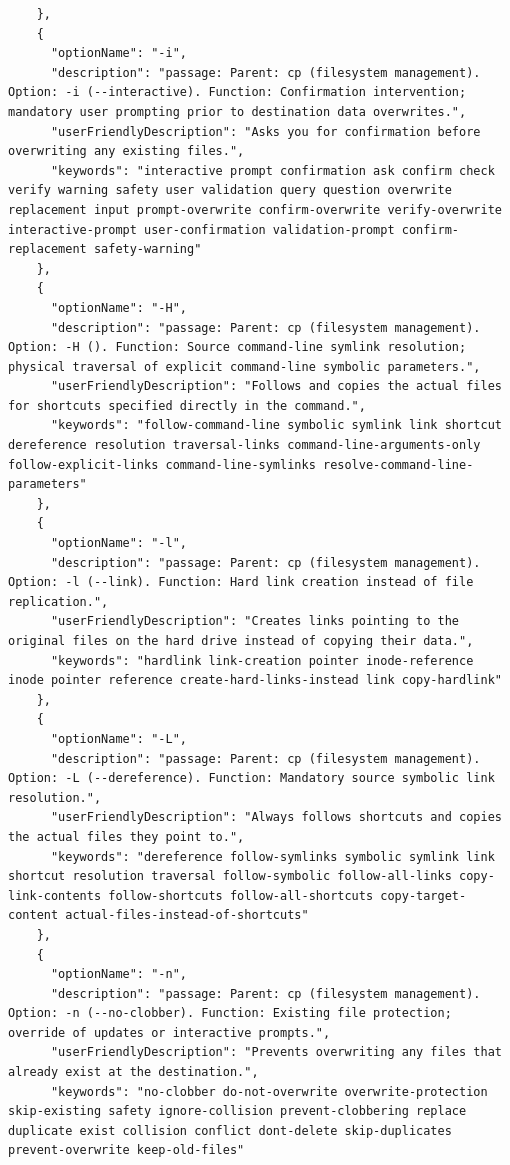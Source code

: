 \begin{appendix}
\begin{lstlisting}
    },
    {
      "optionName": "-i",
      "description": "passage: Parent: cp (filesystem management). Option: -i (--interactive). Function: Confirmation intervention; mandatory user prompting prior to destination data overwrites.",
      "userFriendlyDescription": "Asks you for confirmation before overwriting any existing files.",
      "keywords": "interactive prompt confirmation ask confirm check verify warning safety user validation query question overwrite replacement input prompt-overwrite confirm-overwrite verify-overwrite interactive-prompt user-confirmation validation-prompt confirm-replacement safety-warning"
    },
    {
      "optionName": "-H",
      "description": "passage: Parent: cp (filesystem management). Option: -H (). Function: Source command-line symlink resolution; physical traversal of explicit command-line symbolic parameters.",
      "userFriendlyDescription": "Follows and copies the actual files for shortcuts specified directly in the command.",
      "keywords": "follow-command-line symbolic symlink link shortcut dereference resolution traversal-links command-line-arguments-only follow-explicit-links command-line-symlinks resolve-command-line-parameters"
    },
    {
      "optionName": "-l",
      "description": "passage: Parent: cp (filesystem management). Option: -l (--link). Function: Hard link creation instead of file replication.",
      "userFriendlyDescription": "Creates links pointing to the original files on the hard drive instead of copying their data.",
      "keywords": "hardlink link-creation pointer inode-reference inode pointer reference create-hard-links-instead link copy-hardlink"
    },
    {
      "optionName": "-L",
      "description": "passage: Parent: cp (filesystem management). Option: -L (--dereference). Function: Mandatory source symbolic link resolution.",
      "userFriendlyDescription": "Always follows shortcuts and copies the actual files they point to.",
      "keywords": "dereference follow-symlinks symbolic symlink link shortcut resolution traversal follow-symbolic follow-all-links copy-link-contents follow-shortcuts follow-all-shortcuts copy-target-content actual-files-instead-of-shortcuts"
    },
    {
      "optionName": "-n",
      "description": "passage: Parent: cp (filesystem management). Option: -n (--no-clobber). Function: Existing file protection; override of updates or interactive prompts.",
      "userFriendlyDescription": "Prevents overwriting any files that already exist at the destination.",
      "keywords": "no-clobber do-not-overwrite overwrite-protection skip-existing safety ignore-collision prevent-clobbering replace duplicate exist collision conflict dont-delete skip-duplicates prevent-overwrite keep-old-files"

\end{lstlisting}
\end{appendix}
